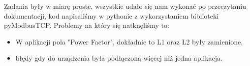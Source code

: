 \documentclass[a4paper,12pt]{extarticle}  %
\begin{document}
Zadania były w miarę proste, wszystkie udało się nam wykonać po przeczytaniu dokumentacji, kod napisaliśmy w pythonie z wykorzystaniem biblioteki pyModbusTCP.
Problemy na który się natknęliśmy to:
\begin{itemize}
	\item W aplikacji pola "Power Factor", dokładnie to L1 oraz L2 były zamienione.
	\item błędy gdy do urządzenia była podłączona więcej niż jedna aplikacja.
\end{itemize}


\end{document}
